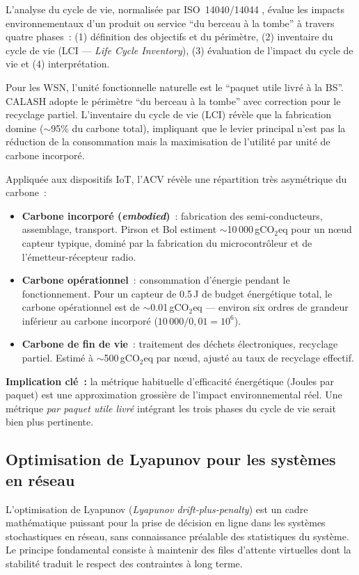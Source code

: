 L'analyse du cycle de vie, normalisée par ISO~14040/14044 \cite{iso14040}, évalue les impacts environnementaux d'un produit ou service ``du berceau à la tombe'' à travers quatre phases~: (1) définition des objectifs et du périmètre, (2) inventaire du cycle de vie (LCI --- \emph{Life Cycle Inventory}), (3) évaluation de l'impact du cycle de vie et (4) interprétation.

Pour les WSN, l'unité fonctionnelle naturelle est le ``paquet utile livré à la BS''. CALASH adopte le périmètre ``du berceau à la tombe'' avec correction pour le recyclage partiel. L'inventaire du cycle de vie (LCI) révèle que la fabrication domine ($\sim$95\% du carbone total), impliquant que le levier principal n'est pas la réduction de la consommation mais la maximisation de l'utilité par unité de carbone incorporé.

Appliquée aux dispositifs IoT, l'ACV révèle une répartition très asymétrique du carbone~:
\begin{itemize}
    \item \textbf{Carbone incorporé (\emph{embodied})}~: fabrication des semi-conducteurs, assemblage, transport. Pirson et Bol \cite{pirson2021embodied} estiment $\sim$10\,000\,gCO$_2$eq pour un n\oe{}ud capteur typique, dominé par la fabrication du microcontrôleur et de l'émetteur-récepteur radio.
    \item \textbf{Carbone opérationnel}~: consommation d'énergie pendant le fonctionnement. Pour un capteur de 0.5\,J de budget énergétique total, le carbone opérationnel est de $\sim$0.01\,gCO$_2$eq --- environ six ordres de grandeur inférieur au carbone incorporé ($10\,000/0{,}01 = 10^6$).
    \item \textbf{Carbone de fin de vie}~: traitement des déchets électroniques, recyclage partiel. Estimé à $\sim$500\,gCO$_2$eq par n\oe{}ud, ajusté au taux de recyclage effectif.
\end{itemize}

\textbf{Implication clé~:} la métrique habituelle d'efficacité énergétique (Joules par paquet) est une approximation grossière de l'impact environnemental réel. Une métrique \emph{par paquet utile livré} intégrant les trois phases du cycle de vie serait bien plus pertinente.

\subsection{Optimisation de Lyapunov pour les systèmes en réseau}

L'optimisation de Lyapunov (\emph{Lyapunov drift-plus-penalty}) \cite{neely2010lyapunov} est un cadre mathématique puissant pour la prise de décision en ligne dans les systèmes stochastiques en réseau, sans connaissance préalable des statistiques du système. Le principe fondamental consiste à maintenir des files d'attente virtuelles dont la stabilité traduit le respect des contraintes à long terme.

